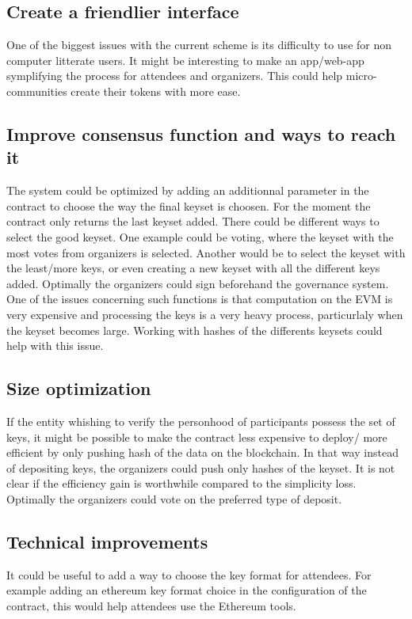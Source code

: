 \documentclass[11pt, a4paper, twoside, openright]{book} %
\begin{document}
\subsection{Create a friendlier interface}
One of the biggest issues with the current scheme is its difficulty to use for non computer litterate users. It might be interesting to make an app/web-app symplifying the process for attendees and organizers. This could help micro-communities create their tokens with more ease.

\subsection{Improve consensus function and ways to reach it}
The system could be optimized by adding an additionnal parameter in the contract to choose the way the final keyset is choosen. For the moment the contract only returns the last keyset added. There could be different ways to select the good keyset. One example could be voting, where the keyset with the most votes from organizers is selected. Another would be to select the keyset with the least/more keys, or even creating a new keyset with all the different keys added. Optimally the organizers could sign beforehand the governance system. One of the issues concerning such functions is that computation on the EVM is very expensive and processing the keys is a very heavy process, particurlaly when the keyset becomes large. Working with hashes of the differents keysets could help with this issue.

\subsection{Size optimization}
If the entity whishing to verify the personhood of participants possess the set of keys, it might be possible to make the contract less expensive to deploy/ more efficient by only pushing hash of the data on the blockchain. In that way instead of depositing keys, the organizers could push only hashes of the keyset. It is not clear if the efficiency gain is worthwhile compared to the simplicity loss. Optimally the organizers could vote on the preferred type of deposit.

\subsection{Technical improvements}
It could be useful to add a way to choose the key format for attendees. For example adding an ethereum key format choice in the configuration of the contract, this would help attendees use the Ethereum tools.
\end{document}
